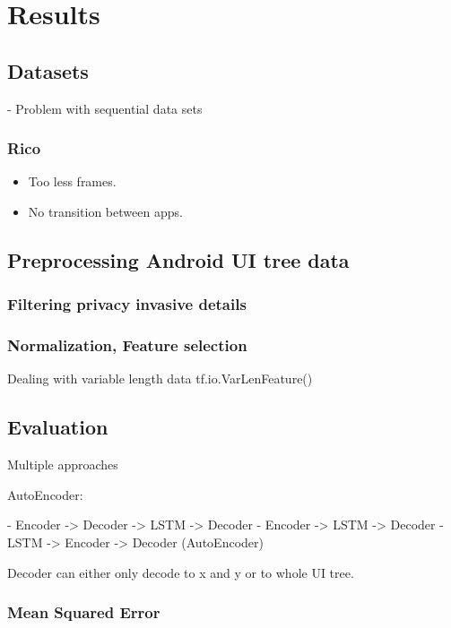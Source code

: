 \chapter{Results}

\section{Datasets}

- Problem with sequential data sets

\subsection{Rico}

\begin{itemize}
  \item Too less frames.
  \item No transition between apps.
\end{itemize}

\section{Preprocessing Android UI tree data}
\subsection{Filtering privacy invasive details}
\subsection{Normalization, Feature selection}

Dealing with variable length data tf.io.VarLenFeature()

\section{Evaluation}


Multiple approaches

AutoEncoder:

- Encoder -> Decoder -> LSTM -> Decoder
- Encoder -> LSTM -> Decoder
- LSTM -> Encoder -> Decoder (AutoEncoder)

Decoder can either only decode to x and y or to whole UI tree.


\subsection{Mean Squared Error}
